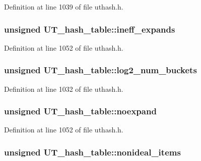 Definition at line 1039 of file uthash.\-h.

\hypertarget{struct_u_t__hash__table_a216c7d98cf40a0064bee94aa8a5bf1b7}{
\subsubsection[{ineff\-\_\-expands}]{\setlength{\rightskip}{0pt plus 5cm}unsigned U\-T\-\_\-hash\-\_\-table\-::ineff\-\_\-expands}}\label{struct_u_t__hash__table_a216c7d98cf40a0064bee94aa8a5bf1b7}


Definition at line 1052 of file uthash.\-h.

\hypertarget{struct_u_t__hash__table_ae376a7f3fac525f3a9d03b6beec8d12f}{
\subsubsection[{log2\-\_\-num\-\_\-buckets}]{\setlength{\rightskip}{0pt plus 5cm}unsigned U\-T\-\_\-hash\-\_\-table\-::log2\-\_\-num\-\_\-buckets}}\label{struct_u_t__hash__table_ae376a7f3fac525f3a9d03b6beec8d12f}


Definition at line 1032 of file uthash.\-h.

\hypertarget{struct_u_t__hash__table_a635661789933752e7b83dac84430eae1}{
\subsubsection[{noexpand}]{\setlength{\rightskip}{0pt plus 5cm}unsigned U\-T\-\_\-hash\-\_\-table\-::noexpand}}\label{struct_u_t__hash__table_a635661789933752e7b83dac84430eae1}


Definition at line 1052 of file uthash.\-h.

\hypertarget{struct_u_t__hash__table_a8cb66cfb259a204cda59a815e4db664f}{
\subsubsection[{nonideal\-\_\-items}]{\setlength{\rightskip}{0pt plus 5cm}unsigned U\-T\-\_\-hash\-\_\-table\-::nonideal\-\_\-items}}\label{struct_u_t__hash__table_a8cb66cfb259a204cda59a815e4db664f}


